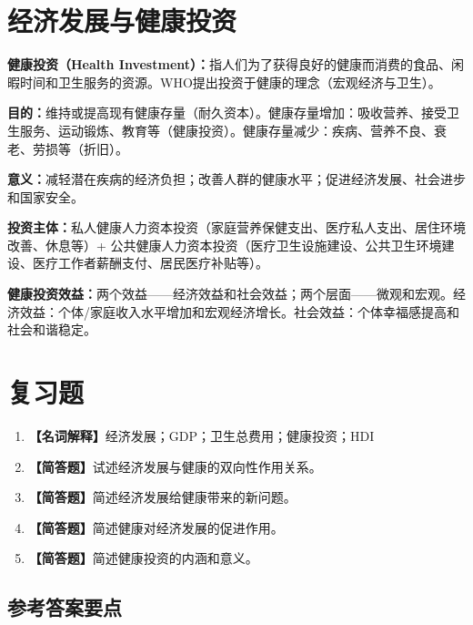 \section{经济发展与健康投资}

\begin{defbox}
\textbf{健康投资（Health Investment）：}指人们为了获得良好的健康而消费的食品、闲暇时间和卫生服务的资源。WHO提出投资于健康的理念（宏观经济与卫生）。

\textbf{目的：}维持或提高现有健康存量（耐久资本）。健康存量增加：吸收营养、接受卫生服务、运动锻炼、教育等（健康投资）。健康存量减少：疾病、营养不良、衰老、劳损等（折旧）。

\textbf{意义：}减轻潜在疾病的经济负担；改善人群的健康水平；促进经济发展、社会进步和国家安全。

\textbf{投资主体：}私人健康人力资本投资（家庭营养保健支出、医疗私人支出、居住环境改善、休息等）+ 公共健康人力资本投资（医疗卫生设施建设、公共卫生环境建设、医疗工作者薪酬支付、居民医疗补贴等）。

\textbf{健康投资效益：}两个效益——经济效益和社会效益；两个层面——微观和宏观。经济效益：个体/家庭收入水平增加和宏观经济增长。社会效益：个体幸福感提高和社会和谐稳定。
\end{defbox}

\section{复习题}

\begin{enumerate}[leftmargin=*, itemsep=8pt]
    \item \textbf{【名词解释】}经济发展；GDP；卫生总费用；健康投资；HDI
    \item \textbf{【简答题】}试述经济发展与健康的双向性作用关系。
    \item \textbf{【简答题】}简述经济发展给健康带来的新问题。
    \item \textbf{【简答题】}简述健康对经济发展的促进作用。
    \item \textbf{【简答题】}简述健康投资的内涵和意义。
\end{enumerate}

\subsection*{参考答案要点}

